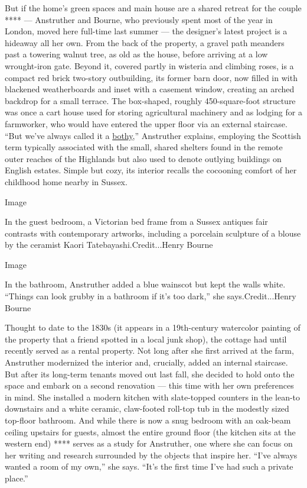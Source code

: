 But if the home's green spaces and main house are a shared retreat for
the couple **** --- Anstruther and Bourne, who previously spent most of
the year in London, moved here full-time last summer --- the designer's
latest project is a hideaway all her own. From the back of the property,
a gravel path meanders past a towering walnut tree, as old as the house,
before arriving at a low wrought-iron gate. Beyond it, covered partly in
wisteria and climbing roses, is a compact red brick two-story
outbuilding, its former barn door, now filled in with blackened
weatherboards and inset with a casement window, creating an arched
backdrop for a small terrace. The box-shaped, roughly 450-square-foot
structure was once a cart house used for storing agricultural machinery
and as lodging for a farmworker, who would have entered the upper floor
via an external staircase. ``But we've always called it a
\href{https://www.nytimes3xbfgragh.onion/2019/01/21/travel/in-search-of-britains-bothies.html}{bothy},''
Anstruther explains, employing the Scottish term typically associated
with the small, shared shelters found in the remote outer reaches of the
Highlands but also used to denote outlying buildings on English estates.
Simple but cozy, its interior recalls the cocooning comfort of her
childhood home nearby in Sussex.

Image

In the guest bedroom, a Victorian bed frame from a Sussex antiques fair
contrasts with contemporary artworks, including a porcelain sculpture of
a blouse by the ceramist Kaori Tatebayashi.Credit...Henry Bourne

Image

In the bathroom, Anstruther added a blue wainscot but kept the walls
white. ``Things can look grubby in a bathroom if it's too dark,'' she
says.Credit...Henry Bourne

Thought to date to the 1830s (it appears in a 19th-century watercolor
painting of the property that a friend spotted in a local junk shop),
the cottage had until recently served as a rental property. Not long
after she first arrived at the farm, Anstruther modernized the interior
and, crucially, added an internal staircase. But after its long-term
tenants moved out last fall, she decided to hold onto the space and
embark on a second renovation --- this time with her own preferences in
mind. She installed a modern kitchen with slate-topped counters in the
lean-to downstairs and a white ceramic, claw-footed roll-top tub in the
modestly sized top-floor bathroom. And while there is now a snug bedroom
with an oak-beam ceiling upstairs for guests, almost the entire ground
floor (the kitchen sits at the western end) **** serves as a study for
Anstruther, one where she can focus on her writing and research
surrounded by the objects that inspire her. ``I've always wanted a room
of my own,'' she says. ``It's the first time I've had such a private
place.''

